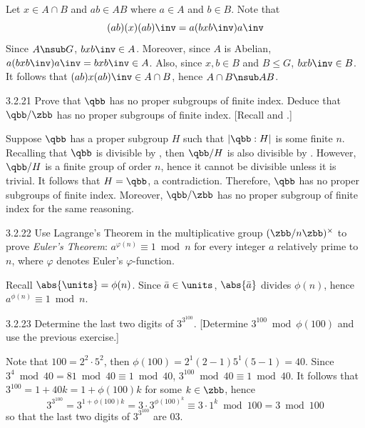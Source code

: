 \begin{sol}[spsol]
    Let $x \in A \cap B$ and $ab \in AB$ where $a \in A$ and $b \in B$.
	Note that
    \[
    	(ab)(x)(ab)\inv = a(bxb\inv)a\inv
    \]
    Since $A \nsub G$, $bxb\inv \in A$.
	Moreover, since $A$ is Abelian, $a(bxb\inv)a\inv = bxb\inv \in A$.
	Also, since $x, b \in B$ and $B \leq G$, $bxb\inv \in B$.
	It follows that $(ab)x(ab)\inv \in A \cap B$, hence $A \cap B \nsub AB$.
\end{sol}

\begin{exercise}{3.2.21}
    Prove that $\qbb$ has no proper subgroups of finite index.
	Deduce that $\qbb/\zbb$ has no proper subgroups of finite index. [Recall  and .]
\end{exercise}

\begin{sol}
    Suppose $\qbb$ has a proper subgroup $H$ such that $|\qbb : H|$ is some finite $n$.
	Recalling that $\qbb$ is divisible by , then $\qbb/H$ is also divisible by .
	However, $\qbb/H$ is a finite group of order $n$, hence it cannot be divisible unless it is trivial.
	It follows that $H = \qbb$, a contradiction.
	Therefore, $\qbb$ has no proper subgroups of finite index.
	Moreover, $\qbb/\zbb$ has no proper subgroup of finite index for the same reasoning.
\end{sol}

\begin{exercise}{3.2.22}
    Use Lagrange's Theorem in the multiplicative group $(\zbb/n\zbb)^\times$ to prove \emph{Euler's Theorem}: $a^{\varphi(n)} \equiv 1 \bmod n$ for every integer $a$ relatively prime to $n$, where $\varphi$ denotes Euler's $\varphi$-function.
\end{exercise}

\begin{sol}
    Recall $\abs{\units} = \phi(n)$.
	Since $\bar a \in \units$, $\abs{\bar a}$ divides $\phi(n)$, hence $a^{\phi(n)} \equiv 1 \bmod n$.
\end{sol}

\begin{exercise}{3.2.23}
    Determine the last two digits of $3^{3^{100}}$. [Determine $3^{100} \bmod \phi(100)$ and use the previous exercise.]
\end{exercise}

\begin{sol}
    Note that $100 = 2^2 \cdot 5^2$, then $\phi(100) = 2^1(2 - 1)5^1(5 - 1) = 40$.
	Since $3^4 \bmod 40 = 81 \bmod 40 \equiv 1 \bmod 40$, $3^{100} \bmod 40 \equiv 1 \bmod 40$.
	It follows that $3^{100} = 1 + 40k = 1 + \phi(100)k$ for some $k \in \zbb$, hence
    \[
    	3^{3^{100}} = 3^{1 + \phi(100)k} = 3 \cdot 3^{{\phi(100)}^k} \equiv 3 \cdot 1^k \bmod 100 = 3 \bmod 100
    \]
    so that the last two digits of $3^{3^{100}}$ are 03.
\end{sol}